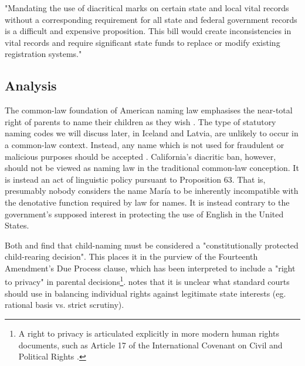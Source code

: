 \begin{aquote}{\parencite{veto}}
	"Mandating the use of diacritical marks on certain state and local vital
	records without a corresponding requirement for all state and federal
	government records is a difficult and expensive proposition. This bill would
	create inconsistencies in vital records and require significant state funds
	to replace or modify existing registration systems."
\end{aquote}

\subsection{Analysis}

The common-law foundation of American naming law emphasises the near-total
right of parents to name their children as they wish \parencite{heymann11}. The
type of statutory naming codes we will discuss later, in Iceland and Latvia,
are unlikely to occur in a common-law context. Instead, any name which is not
used for fraudulent or malicious purposes should be accepted
\parencite{ferner96} \parencite{finch08} \parencite{heymann11}. California's
diacritic ban, however, should not be viewed as naming law in the traditional
common-law conception. It is instead an act of linguistic policy pursuant to
Proposition 63. That is, presumably nobody considers the name María to be
inherently incompatible with the denotative function required by law for names.
It is instead contrary to the government's supposed interest in protecting the
use of English in the United States.

Both \textcite{larson11} and \textcite[598]{foggan83} find that child-naming must
be considered a "constitutionally protected child-rearing decision". This
places it in the purview of the Fourteenth Amendment's Due Process clause,
which has been interpreted to include a "right to privacy" in parental
decisions\footnote{A right to privacy is articulated explicitly in more modern
human rights documents, such as Article 17 of the International Covenant on
Civil and Political Rights \parencite{iccpr}.}. \textcite{larson11} notes that
it is unclear what standard courts should use in balancing individual rights
against legitimate state interests (eg. rational basis vs. strict scrutiny).

